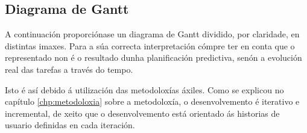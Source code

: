 \subsection{Diagrama de Gantt}

A continuación proporciónase un diagrama de Gantt dividido, por claridade, en distintas imaxes. Para a súa correcta interpretación cómpre ter en conta que o representado non é o resultado dunha planificación predictiva, senón a evolución real das tarefas a través do tempo. 

Isto é así debido á utilización das metodoloxías áxiles. Como se explicou no capítulo \ref{chp:metodoloxia} sobre a metodoloxía, o desenvolvemento é iterativo e incremental, de xeito que o desenvolvemento está orientado ás historias de usuario definidas en cada iteración.



